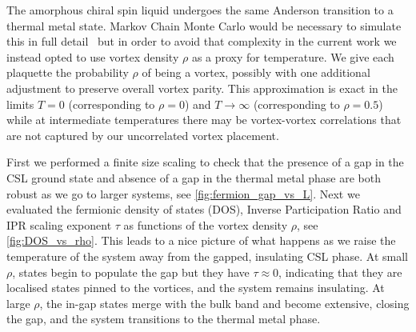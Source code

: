 The amorphous chiral spin liquid undergoes the same Anderson transition to a thermal metal state. Markov Chain Monte Carlo would be necessary to simulate this in full detail~\autocite{selfThermallyInducedMetallic2019} but in order to avoid that complexity in the current work we instead opted to use vortex density \(\rho\) as a proxy for temperature. We give each plaquette the probability \(\rho\) of being a vortex, possibly with one additional adjustment to preserve overall vortex parity. This approximation is exact in the limits \(T = 0\) (corresponding to \(\rho = 0\)) and \(T \to \infty\) (corresponding to \(\rho = 0.5\)) while at intermediate temperatures there may be vortex-vortex correlations that are not captured by our uncorrelated vortex placement.

First we performed a finite size scaling to check that the presence of a gap in the CSL ground state and absence of a gap in the thermal metal phase are both robust as we go to larger systems, see \cref{fig:fermion_gap_vs_L}. Next we evaluated the fermionic density of states (DOS), Inverse Participation Ratio and IPR scaling exponent \(\tau\) as functions of the vortex density \(\rho\), see \cref{fig:DOS_vs_rho}. This leads to a nice picture of what happens as we raise the temperature of the system away from the gapped, insulating CSL phase. At small \(\rho\), states begin to populate the gap but they have \(\tau\approx0\), indicating that they are localised states pinned to the vortices, and the system remains insulating. At large \(\rho\), the in-gap states merge with the bulk band and become extensive, closing the gap, and the system transitions to the thermal metal phase.

